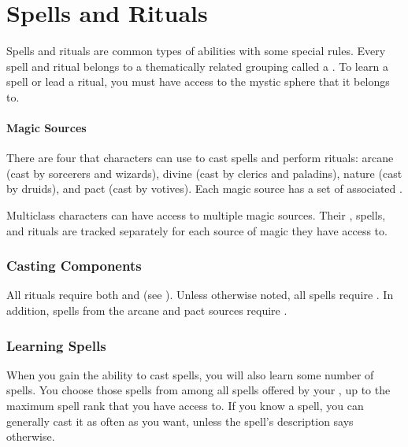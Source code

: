 \chapter{Spells and Rituals}\label{Spells and Rituals}

  Spells and rituals are common types of \magical abilities with some special rules.
  Every spell and ritual belongs to a thematically related grouping called a .
  To learn a spell or lead a ritual, you must have access to the mystic sphere that it belongs to.

  \subsubsection{Magic Sources}
    There are four  that characters can use to cast spells and perform rituals: arcane (cast by sorcerers and wizards), divine (cast by clerics and paladins), nature (cast by druids), and pact (cast by votives).
    Each magic source has a set of associated .

    Multiclass characters can have access to multiple magic sources.
    Their , spells, and rituals are tracked separately for each source of magic they have access to.

  \subsection{Casting Components}\label{Casting Components}
    All rituals require both  and  (see ).
    Unless otherwise noted, all spells require .
    In addition, spells from the arcane and pact sources require .

  \subsection{Learning Spells}
    When you gain the ability to cast spells, you will also learn some number of spells.
    You choose those spells from among all spells offered by your , up to the maximum spell rank that you have access to.
    If you know a spell, you can generally cast it as often as you want, unless the spell's description says otherwise.

